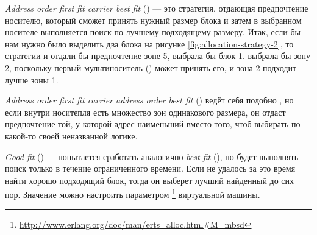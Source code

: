 \documentclass[11pt, oneside]{book}   	%
\newcommand\NamedRef[1]{\ref{#1} <<\nameref{#1}>>}
\begin{document}
\emph{Address order first fit carrier best fit} () --- это стратегия, отдающая предпочтение носителю, который сможет принять нужный размер блока и затем в выбранном носителе выполняется поиск по лучшему подходящему размеру. Итак, если бы нам нужно было выделить два блока на рисунке \ref{fig:allocation-strategy-2}, то стратегии  и  отдали бы предпочтение зоне 5,  выбрала бы блок 1.  выбрала бы зону 2, поскольку первый мультиноситель () может принять его, и зона 2 подходит лучше зоны 1.

\emph{Address order first fit carrier address order best fit} () ведёт себя подобно , но если внутри носитепля есть множество зон одинакового размера, он отдаст предпочтение той, у которой адрес наименьший вместо того, чтоб выбирать по какой-то своей неназванной логике.

\emph{Good fit} () --- попытается сработать аналогично \emph{best fit} (), но будет выполнять поиск только в течение ограниченного времени. Если не удалось за это время найти хорошо подходящий блок, тогда он выберет лучший найденный до сих пор. Значение можно настроить параметром \footnote{\href{http://www.erlang.org/doc/man/erts\_alloc.html\#M\_mbsd}{http://www.erlang.org/doc/man/erts\_alloc.html\#M\_mbsd}} виртуальной машины.
\end{document}

